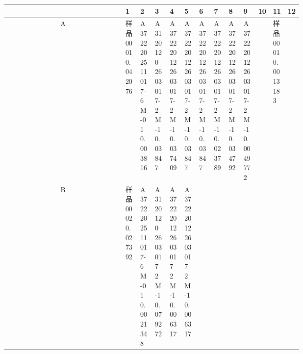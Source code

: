 \documentclass[UTF8,10pt,a4paper,fontset=fandol]{ctexart}
\begin{document}
\begin{center}
\tiny
\begin{tabular}{c|p{0.058\linewidth}|p{0.058\linewidth}|p{0.058\linewidth}|p{0.058\linewidth}|p{0.058\linewidth}|p{0.058\linewidth}|p{0.058\linewidth}|p{0.058\linewidth}|p{0.058\linewidth}|p{0.058\linewidth}|p{0.058\linewidth}|p{0.058\linewidth}}
 & 1 & 2 & 3 & 4 & 5 & 6 & 7 & 8 & 9 & 10 & 11 & 12\\ \hline
A &
\parbox[t]{0.058\linewidth}{\raggedright 样品0001\\0.042076} &
\parbox[t]{0.058\linewidth}{\raggedright A37222025\\11017-6M-01\\0.003816} &
\parbox[t]{0.058\linewidth}{\raggedright A3120120\\2603017-2M-1\\0.03847} &
\parbox[t]{0.058\linewidth}{\raggedright A37222012\\2603017-2M-1\\0.037409} &
\parbox[t]{0.058\linewidth}{\raggedright A37222012\\2603017-2M-1\\0.03847} &
\parbox[t]{0.058\linewidth}{\raggedright A37222012\\2603017-2M-1\\0.03847} &
\parbox[t]{0.058\linewidth}{\raggedright A37222012\\2603017-2M-1\\0.023789} &
\parbox[t]{0.058\linewidth}{\raggedright A37222012\\2603017-2M-1\\0.034792} &
\parbox[t]{0.058\linewidth}{\raggedright A37222012\\2603017-2M-1\\0.0049772} &
 & \parbox[t]{0.058\linewidth}{\raggedright 样品0001\\0.0013183} & \\ \hline
B &
\parbox[t]{0.058\linewidth}{\raggedright 样品0002\\0.027392} &
\parbox[t]{0.058\linewidth}{\raggedright A37222025\\11017-6M-01\\0.0021348} &
\parbox[t]{0.058\linewidth}{\raggedright A3120120\\2603017-2M-1\\0.079272} &
\parbox[t]{0.058\linewidth}{\raggedright A37222012\\2603017-2M-1\\0.006317} &
\parbox[t]{0.058\linewidth}{\raggedright A37222012\\2603017-2M-1\\0.006317} &

\end{tabular}
\end{center}
\end{document}
